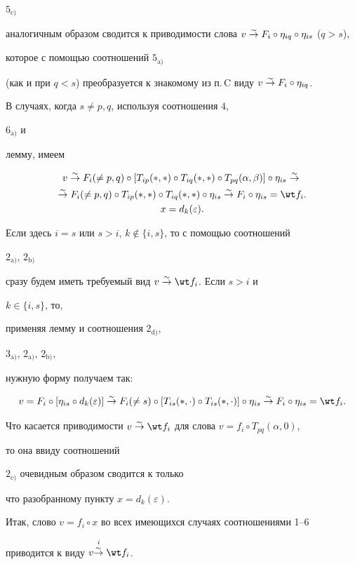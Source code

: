 \begin{pf}
$5_{\mathrm c)}$ 


аналогичным образом сводится к приводимости слова $v\simto 


F_i\circ\eta_{iq}\circ\eta_{is}$ ($q>s$), 


которое с помощью соотношений $5_{\mathrm a)}$ 


(как и при $q<s$) преобразуется к знакомому из п.\,C виду $v\simto 


F_i\circ\eta_{iq}$.


 


В случаях, когда $s\ne p,q$, используя соотношения $4$, 


$6_{\mathrm a)}$ и 


лемму, имеем 


\begin{gather*} 


v\simto F_i(\ne p,q)\circ[T_{ip}(*,*)\circ T_{iq}(*,*)\circ 


T_{pq}(\alpha,\beta)]\circ\eta_{is}\simto \\ 


\simto F_i(\ne p,q)\circ T_{ip}(*,*)\circ 


T_{iq}(*,*)\circ\eta_{is}\simto F_i\circ\eta_{is}=\wt f_i.\\ 


x=d_k(\varepsilon). 


\end{gather*} 


Если здесь $i=s$ или $s>i$, $k\notin\{i,s\}$, то с помощью соотношений 


$2_{\mathrm a)}$, $2_{\mathrm b)}$ 


сразу будем иметь требуемый вид $v\simto\wt f_i$. Если $s>i$ и 


$k\in\{i,s\}$, то, 


применяя лемму и соотношения $2_{\mathrm d)}$, 


$3_{\mathrm a)}$, $2_{\mathrm a)}$, $2_{\mathrm b)}$, 


нужную форму получаем так: 


$$ 


v=F_i\circ[\eta_{is}\circ d_k(\varepsilon)]\simto 


F_i(\ne s)\circ[T_{is}(*,\cdot)\circ 


T_{is}(*,\cdot)]\circ\eta_{is}\simto F_i\circ 


\eta_{is}=\wt f_i. 


$$ 


Что касается приводимости $v\simto\wt f_i$ для слова $v=f_i\circ 


T_{pq}(\alpha,0)$, 


то она ввиду соотношений 


$2_{\mathrm c)}$ очевидным образом сводится к только 


что разобранному пункту $x=d_k(\varepsilon)$. 


 


Итак, слово $v=f_i\circ x$ во всех имеющихся случаях соотношениями 1--6 


приводится к виду $v\isimto\wt f_i$. 


\end{pf} 
